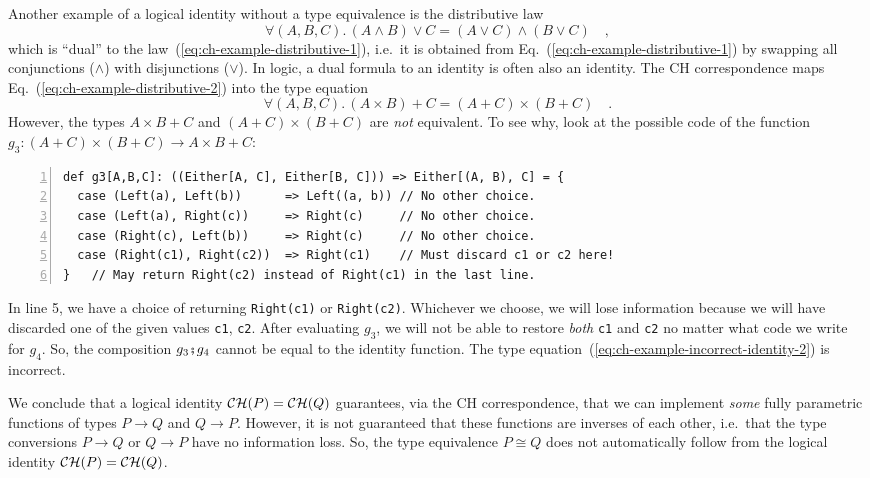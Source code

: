 Another example of a logical identity without a type equivalence is
the distributive law 
\begin{equation}
\forall(A,B,C).\,\left(A\wedge B\right)\vee C=\left(A\vee C\right)\wedge\left(B\vee C\right)\quad,\label{eq:ch-example-distributive-2}
\end{equation}
which is ``dual'' to the law~(\ref{eq:ch-example-distributive-1}),
i.e.~it is obtained from Eq.~(\ref{eq:ch-example-distributive-1})
by swapping all conjunctions ($\wedge$) with disjunctions ($\vee$).
In logic, a dual formula to an identity is often also an identity.
The CH correspondence maps Eq.~(\ref{eq:ch-example-distributive-2})
into the type equation
\begin{equation}
\forall(A,B,C).\,\left(A\times B\right)+C=\left(A+C\right)\times\left(B+C\right)\quad.\label{eq:ch-example-incorrect-identity-2}
\end{equation}
However, the types $A\times B+C$ and $\left(A+C\right)\times\left(B+C\right)$
are \emph{not} equivalent. To see why, look at the possible code of
the function $g_{3}:\left(A+C\right)\times\left(B+C\right)\rightarrow A\times B+C$:
\begin{lstlisting}[numbers=left,numberstyle={\small}]
def g3[A,B,C]: ((Either[A, C], Either[B, C])) => Either[(A, B), C] = {
  case (Left(a), Left(b))      => Left((a, b)) // No other choice.
  case (Left(a), Right(c))     => Right(c)     // No other choice.
  case (Right(c), Left(b))     => Right(c)     // No other choice.
  case (Right(c1), Right(c2))  => Right(c1)    // Must discard c1 or c2 here!
}   // May return Right(c2) instead of Right(c1) in the last line.
\end{lstlisting}
In line 5, we have a choice of returning \lstinline!Right(c1)! or
\lstinline!Right(c2)!. Whichever we choose, we will lose information
because we will have discarded one of the given values \lstinline!c1!,
\lstinline!c2!. After evaluating $g_{3}$, we will not be able to
restore \emph{both} \lstinline!c1! and \lstinline!c2! \textendash{}
no matter what code we write for $g_{4}$. So, the composition $g_{3}\bef g_{4}$
cannot be equal to the identity function. The type equation~(\ref{eq:ch-example-incorrect-identity-2})
is incorrect.

We conclude that a logical identity ${\cal CH}(P)={\cal CH}(Q)$ guarantees,
via the CH correspondence, that we can implement \emph{some} fully
parametric functions of types $P\rightarrow Q$ and $Q\rightarrow P$.
However, it is not guaranteed that these functions are inverses of
each other, i.e.~that the type conversions $P\rightarrow Q$ or $Q\rightarrow P$
have no information loss. So, the type equivalence
$P\cong Q$ does not automatically follow from the logical identity
${\cal CH}(P)={\cal CH}(Q)$.

